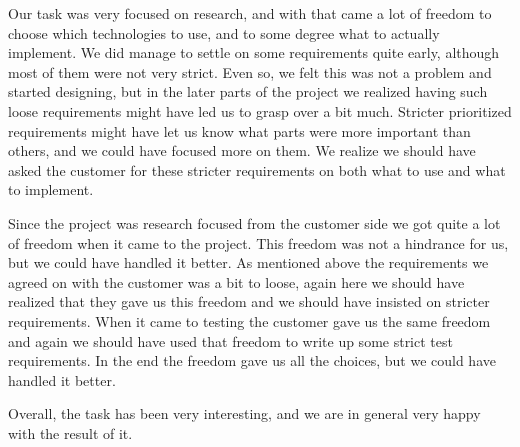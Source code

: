 Our task was very focused on research, and with that came a lot of freedom to choose which technologies to use, and to some degree what to actually implement. We did manage to settle on some requirements quite early, although most of them were not very strict. Even so, we felt this was not a problem and started designing, but in the later parts of the project we realized having such loose requirements might have led us to grasp over a bit much. Stricter prioritized requirements might have let us know what parts were more important than others, and we could have focused more on them. We realize we should have asked the customer for these stricter requirements on both what to use and what to implement.

Since the project was research focused from the customer side we got quite a lot of freedom when it came to the project. This freedom was not a hindrance for us, but we could have handled it better. As mentioned above the requirements we agreed on with the customer was a bit to loose, again here we should have realized that they gave us this freedom and we should have insisted on stricter requirements. When it came to testing the customer gave us the same freedom and again we should have used that freedom to write up some strict test requirements. In the end the freedom gave us all the choices, but we could have handled it better.

Overall, the task has been very interesting, and we are in general very happy with the result of it.
